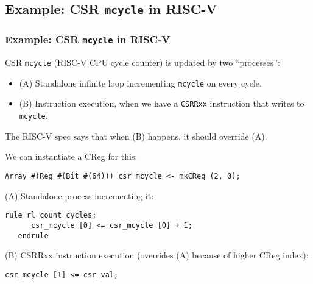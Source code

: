 
\subsection{Example: CSR {\tt mcycle} in RISC-V}

\begin{frame}[fragile]
\frametitle{Example: CSR {\tt mcycle} in RISC-V}

\footnotesize

CSR {\tt mcycle} (RISC-V CPU cycle counter) is updated by two ``processes'':

\begin{itemize}

 \item (A) Standalone infinite loop incrementing {\tt mcycle} on every cycle.

 \item (B) Instruction execution, when we have a {\tt CSRRxx} instruction
           that writes to {\tt mcycle}.
\end{itemize}

The RISC-V spec says that when (B) happens, it should override (A).

\PAUSE{\vspace{5ex}}

We can instantiate a CReg for this:

\vspace{1ex}

\begin{Verbatim}[frame=single, label=from src\_Common/CSRs.bsv]
   Array #(Reg #(Bit #(64))) csr_mcycle <- mkCReg (2, 0);
\end{Verbatim}

\vspace{2ex}

(A) Standalone process incrementing it:

\vspace{1ex}

\begin{Verbatim}[frame=single, label=from src\_Common/CSRs.bsv]
   rule rl_count_cycles;
      csr_mcycle [0] <= csr_mcycle [0] + 1;
   endrule
\end{Verbatim}

\vspace{2ex}

(B) CSRRxx instruction execution (overrides (A) because of higher CReg index):

\vspace{1ex}

\begin{Verbatim}[frame=single, label=from src\_Common/CSRs.bsv in function fav\_csr\_write()]
   csr_mcycle [1] <= csr_val;
\end{Verbatim}

\end{frame}


